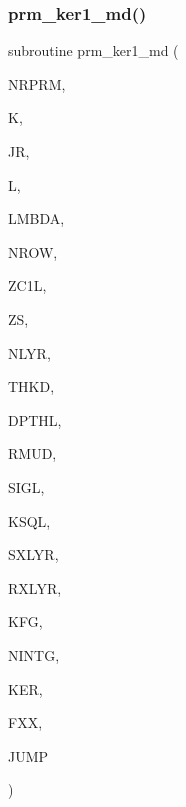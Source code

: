 \subsubsection{\texorpdfstring{prm\+\_\+ker1\+\_\+md()}{prm\_ker1\_md()}}
{\footnotesize\ttfamily subroutine prm\+\_\+ker1\+\_\+md (\begin{DoxyParamCaption}\item[{integer}]{N\+R\+P\+RM,  }\item[{integer}]{K,  }\item[{integer}]{JR,  }\item[{integer}]{L,  }\item[{real(kind=ql)}]{L\+M\+B\+DA,  }\item[{integer}]{N\+R\+OW,  }\item[{real, dimension(nrow)}]{Z\+C1L,  }\item[{real(kind=ql)}]{ZS,  }\item[{integer}]{N\+L\+YR,  }\item[{real(kind=ql), dimension (nlyr)}]{T\+H\+KD,  }\item[{real(kind=ql), dimension (nlyr)}]{D\+P\+T\+HL,  }\item[{real(kind=ql), dimension(0\+:nlyr)}]{R\+M\+UD,  }\item[{complex(kind=ql), dimension (nlyr)}]{S\+I\+GL,  }\item[{complex(kind=ql), dimension (nlyr)}]{K\+S\+QL,  }\item[{integer}]{S\+X\+L\+YR,  }\item[{integer}]{R\+X\+L\+YR,  }\item[{integer}]{K\+FG,  }\item[{integer}]{N\+I\+N\+TG,  }\item[{complex (kind=ql), dimension(jnlo-\/nrprm\+:jnhi,5,nrow)}]{K\+ER,  }\item[{complex (kind=ql), dimension(nrprm,5,nrow)}]{F\+XX,  }\item[{logical}]{J\+U\+MP }\end{DoxyParamCaption})}


